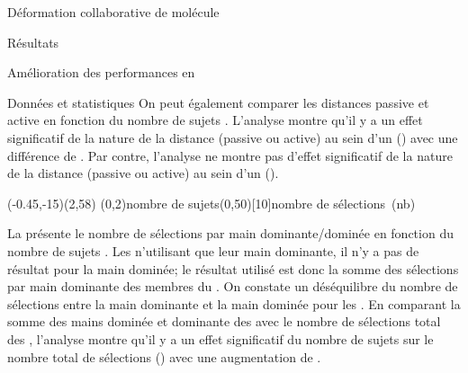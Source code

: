 \documentclass[myfrancais,ngerman,english,french]{mythesis}
\begin{document}
\begin{mychapter}{Déformation collaborative de molécule}
\begin{mysection}{Résultats}
\begin{mysubsection}{Amélioration des performances en }
\begin{mysubsubsection}{Données et statistiques}
					On peut également comparer les distances passive et active en fonction du nombre de sujets .
					L'analyse montre qu'il y a un effet significatif de la nature de la distance (passive ou active) au sein d'un  () avec une différence de .
					Par contre, l'analyse ne montre pas d'effet significatif de la nature de la distance (passive ou active) au sein d'un  ().

					\begin{myfigure}
						\begin{myps}(-0.45,-15)(2,58)
							\myaxes(0,2){nombre de sujets}(0,50)[10]{nombre de sélections~(nb)}
						\end{myps}
					\end{myfigure}

					La  présente le nombre de sélections par main dominante/dominée  en fonction du nombre de sujets .
					Les  n'utilisant que leur main dominante, il n'y a pas de résultat pour la main dominée; le résultat utilisé est donc la somme des sélections par main dominante des membres du .
					On constate un déséquilibre du nombre de sélections entre la main dominante et la main dominée pour les .
					En comparant la somme des mains dominée et dominante des  avec le nombre de sélections total des , l'analyse montre qu'il y a un effet significatif du nombre de sujets  sur le nombre total de sélections  () avec une augmentation de .


\end{mysubsubsection}
\end{mysubsection}
\end{mysection}
\end{mychapter}
\end{document}
